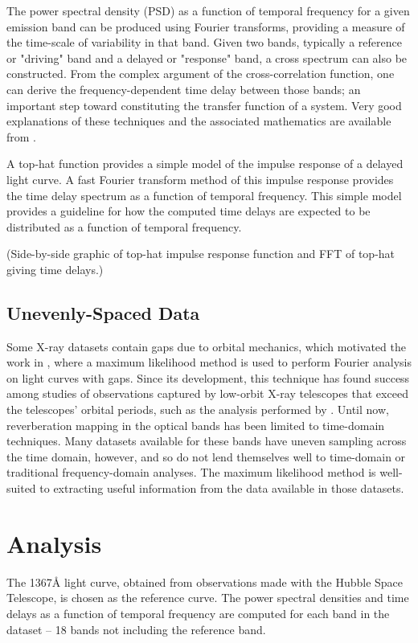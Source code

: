 \documentclass[a4paper,fleqn,usenatbib]{article}
\begin{document}
	The power spectral density (PSD) as a function of temporal frequency for a
	given emission band can be produced using Fourier transforms, providing a
	measure of the time-scale of variability in that band. Given two bands,
	typically a reference or "driving" band and a delayed or "response" band,
	a cross spectrum can also be constructed. From the complex
	argument of the cross-correlation function, one can derive the
	frequency-dependent time delay between those bands; an important step
	toward
	constituting the transfer function of a system. Very good explanations of
	these techniques and the associated mathematics are available from
	\cite{2014A&ARv..22...72U}.

	A top-hat function provides a simple model of the impulse response of a
	delayed light curve. A fast Fourier transform method of this impulse
	response provides the time delay spectrum as a function of temporal
	frequency. This simple model provides a guideline for how the computed
	time delays are expected to be distributed as a function of temporal
	frequency.


	(Side-by-side graphic of top-hat impulse response function and FFT of
	top-hat giving time delays.)

	\subsection{Unevenly-Spaced Data}
 	
 	Some X-ray datasets contain gaps due to orbital mechanics, which motivated
	the work in \cite{2013ApJ...777...24Z}, where a maximum likelihood method
	is used to perform Fourier analysis on light curves with gaps. Since its
	development, this technique has found success among studies of
	observations captured by low-orbit X-ray telescopes that exceed the
	telescopes' orbital periods, such as the analysis performed by
	\cite{2016arXiv160606736K}. Until now, reverberation mapping in the
	optical bands has been limited to time-domain techniques. Many datasets
	available for these bands have uneven sampling across the time domain,
	however, and so do not lend themselves well to time-domain or traditional
	frequency-domain analyses. The maximum likelihood method is well-suited
	to extracting useful information from the data available in those
	datasets.



\section{Analysis}
The 1367\AA$ $ light curve, obtained from observations made with the Hubble
Space Telescope, is chosen as the reference curve. The power spectral
densities and time delays as a function of temporal frequency are computed for
each band in the dataset -- 18 bands not including the reference band.
\end{document}
